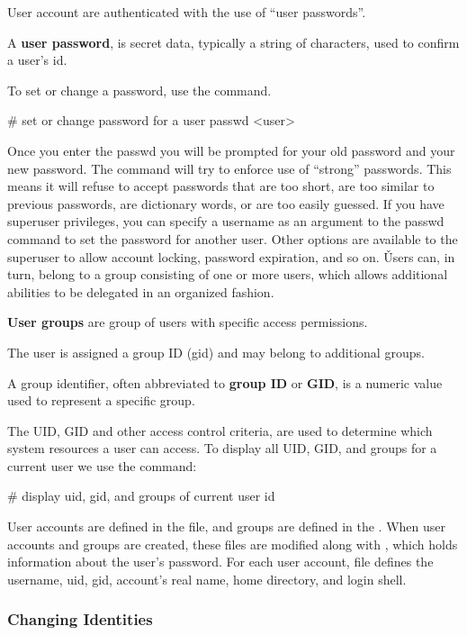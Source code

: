 User account are authenticated with the use of ``user passwords''.

A \textbf{user password}, is secret data, typically a string of characters, used to confirm a user's id.
\ed

To set or change a password, use the  command.
\begin{bash}
# set or change password for a user
passwd <user>
\end{bash}

Once you enter the passwd you will be prompted for your old password and your new password. The  command
will try to enforce use of ``strong'' passwords. This means it will refuse to accept passwords that are too short,
are too similar to previous passwords, are dictionary words, or are too easily guessed. If you have superuser
privileges, you can specify a username as an argument to the passwd command to set the password for another user.
Other options are available to the superuser to allow account locking, password expiration, and so on. \v

Users can, in turn, belong to a group consisting of one or more users, which allows additional abilities to be delegated
in an organized fashion.

\textbf{User groups} are group of users with specific access permissions.
\ed

The user is assigned a group ID (gid) and may belong to additional groups.

A group identifier, often abbreviated to \textbf{group ID} or \textbf{GID}, is a numeric value used to represent a
specific group.
\ed

The UID, GID and other access control criteria, are used to determine which system resources a user can access. To
display all UID, GID, and groups for a current user we use the  command:
\begin{bash}
# display uid, gid, and groups of current user
id
\end{bash}

User accounts are defined in the  file, and groups are defined in the . When
user accounts and groups are created, these files are modified along with , which holds information
about the user's password. For each user account,  file defines the username, uid, gid, account's
real name, home directory, and login shell.

\subsubsection{Changing Identities}

